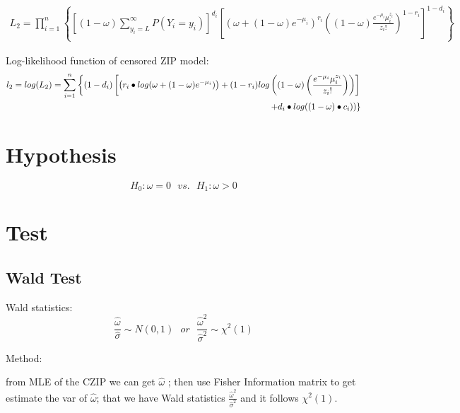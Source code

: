 \documentclass[11pt]{article}
\numberwithin{equation}{section}
\begin{document}
\begin{align}
            L_2 = \prod_{i=1}^n \left\{
                                    \left[(1-\omega) \sum_{y_i=L}^{\infty}{P(Y_i=y_i)} \right]^{d_i}
                                    \left[
                                            \left( \omega+(1-\omega)e^{-\mu_i} \right)^{r_i}
                                            \left((1-\omega)\frac{e^{-\mu_i}\mu_i^{z_i}}{z_i!}\right)^{1-r_i}
                                    \right]^{1-d_i}
                                \right\} \nonumber
\end{align}


Log-likelihood function of censored ZIP model:
\begin{align}
            l_2=log(L_2)
            = \sum_{i=1}^n \left\{
                (1-d_i) \left[
                \left( r_i \bullet log(\omega +(1-\omega)e^{-\mu_i}) \right)
                + (1-r_i)log\left(   \left(1-\omega \right)
                                  \left(\frac{e^{-\mu_i}\mu_i^{z_i}}{z_i!}\right)   \right)
                            \right]
\notag\right.
\\
\phantom{=\;\;}
\left.
                + d_i \bullet log((1-\omega)\bullet c_i))
            \right\} \nonumber
\end{align}


\section{Hypothesis}
\label{sec2}
$$H_0:\omega = 0\:\:\: vs.\:\:\:H_1:\omega > 0$$


\section{Test}
\label{sec3}

\subsection{Wald Test}  \label{sec3-1}
Wald statistics:
        $$ \frac{\hat{\omega}}{\hat{\sigma}} \sim N(0,1) \:\:\:or\:\:\: \frac{\hat{\omega}^2}{\hat{\sigma}^2} \sim \chi^2(1)$$

Method:

from MLE of the CZIP we can get $\hat{\omega}$ ;
then use Fisher Information matrix to get estimate the var of $\hat{\omega}$;
that we have Wald statistics $\frac{\hat{\omega}^2}{\hat{\sigma}^2}$ and it follows $\chi^2(1)$.
\end{document}
